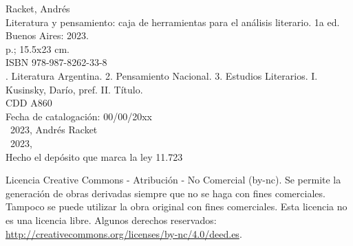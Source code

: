 \noindent Racket, Andrés \\
\noindent Literatura y pensamiento: caja de herramientas para el análisis literario. 1a ed. Buenos Aires: 2023.\\
 p.; 15.5x23 cm.\\
\noindent ISBN 978-987-8262-33-8 \\
. Literatura Argentina. 2. Pensamiento Nacional. 3. Estudios Literarios. I. Kusinsky, Darío,
pref. II. Título. \\
\noindent CDD A860 \\
\noindent Fecha de catalogación: 00/00/20xx \\
\noindent \textcopyright~2023, Andrés Racket \\
\noindent \textcopyright~2023, \\
\noindent Hecho el depósito que marca la ley 11.723\\

\vfill

\noindent Licencia Creative Commons - Atribución - No Comercial (by-nc). Se permite la generación de obras derivadas siempre que no se haga con fines comerciales. Tampoco se puede utilizar la obra original con fines comerciales. Esta licencia no es una licencia libre. Algunos derechos reservados: \url{http://creativecommons.org/licenses/by-nc/4.0/deed.es}.
